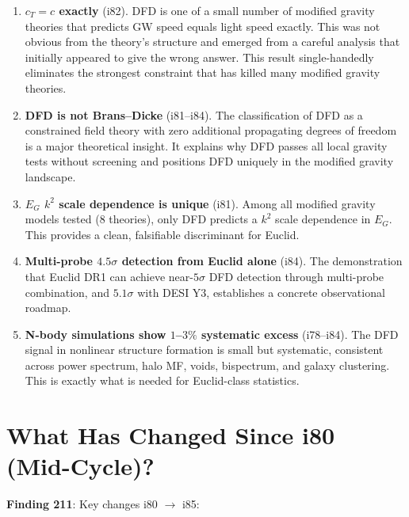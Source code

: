 \documentclass[11pt,a4paper]{article}
\begin{document}
\begin{enumerate}
\item \textbf{$c_T = c$ exactly} (i82). DFD is one of a small number of modified gravity theories that predicts GW speed equals light speed exactly. This was not obvious from the theory's structure and emerged from a careful analysis that initially appeared to give the wrong answer. This result single-handedly eliminates the strongest constraint that has killed many modified gravity theories.

\item \textbf{DFD is not Brans--Dicke} (i81--i84). The classification of DFD as a constrained field theory with zero additional propagating degrees of freedom is a major theoretical insight. It explains why DFD passes all local gravity tests without screening and positions DFD uniquely in the modified gravity landscape.

\item \textbf{$E_G$ $k^2$ scale dependence is unique} (i81). Among all modified gravity models tested (8 theories), only DFD predicts a $k^2$ scale dependence in $E_G$. This provides a clean, falsifiable discriminant for Euclid.

\item \textbf{Multi-probe $4.5\sigma$ detection from Euclid alone} (i84). The demonstration that Euclid DR1 can achieve near-$5\sigma$ DFD detection through multi-probe combination, and $5.1\sigma$ with DESI Y3, establishes a concrete observational roadmap.

\item \textbf{N-body simulations show $1$--$3\%$ systematic excess} (i78--i84). The DFD signal in nonlinear structure formation is small but systematic, consistent across power spectrum, halo MF, voids, bispectrum, and galaxy clustering. This is exactly what is needed for Euclid-class statistics.
\end{enumerate}

\section{What Has Changed Since i80 (Mid-Cycle)?}

\textbf{Finding 211}: Key changes i80 $\to$ i85:
\end{document}
